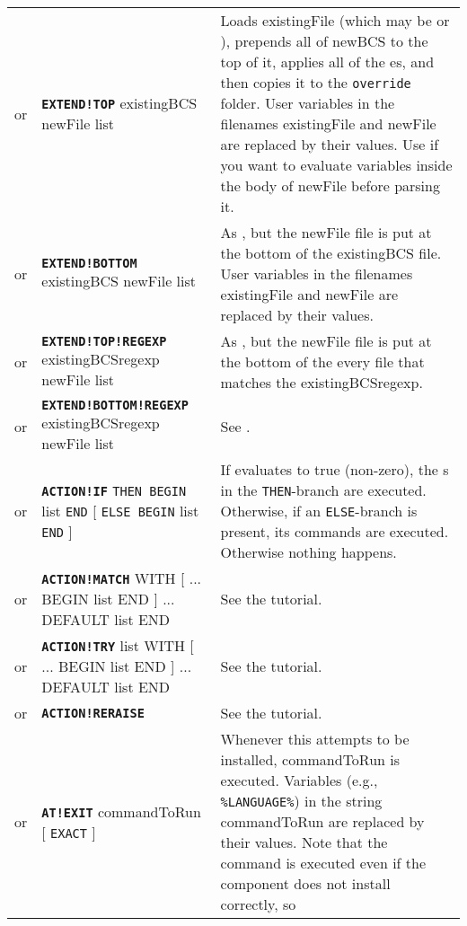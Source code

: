 \documentclass{article}
\def\ttref#1{\ahrefloc{#1}{\tt #1}}
\def\DEFINE#1{{\tt \bf #1}\label{#1}\index{#1}}
\def\DEFSYN#1{{\tt \bf #1}\index{#1}}
\def\t#1{{\tt #1}}
\def\Slist{{\color{red} list }}
\def\Ob{{\color{red} [ }}
\def\Oe{{\color{red} ] }}
\begin{document}
\begin{tabular}{cp{10in}|p{10in}}
  or & \DEFSYN{EXTEND!TOP} existingBCS newFile \ttref{patch} \Slist &
    Loads existingFile (which may be \ttref{BAF} or \ttref{BCS}), prepends
    all of newBCS to the top of it, applies all of the \ttref{patch}es, and
    then copies it to the \t{override} folder. User variables in
    the filenames existingFile and newFile are replaced by their values.
    Use \ttref{EVALUATE!BUFFER} if you want to evaluate variables inside
    the body of newFile before parsing it. \\
  or & \DEFSYN{EXTEND!BOTTOM} existingBCS newFile \ttref{patch} \Slist &
    As \ttref{EXTEND!TOP}, but the newFile file is put at the bottom of the
    existingBCS file. User variables in the filenames existingFile and
    newFile are replaced by their values. \\
  or & \DEFINE{EXTEND!TOP!REGEXP} existingBCSregexp newFile \ttref{patch} \Slist &
    As \ttref{EXTEND!TOP}, but the newFile file is put at the bottom of the
    every \ttref{BCS} file that matches the \ttref{regexp}
    existingBCSregexp. \\
  or & \DEFINE{EXTEND!BOTTOM!REGEXP} existingBCSregexp newFile \ttref{patch} \Slist &
    See \ttref{EXTEND!TOP!REGEXP}.  \\
  or & \DEFINE{ACTION!IF} \ttref{value} \t{THEN BEGIN}
    \ttref{TP2 Action} \Slist \t{END}
    \Ob \t{ELSE BEGIN} \ttref{TP2 Action} \Slist \t{END} \Oe &
    If \ttref{value} evaluates to true (non-zero), the \ttref{TP2 Action}s
    in the \t{THEN}-branch are executed. Otherwise, if an \t{ELSE}-branch
    is present, its commands are executed. Otherwise nothing happens. \\
  or & \DEFINE{ACTION!MATCH} \ttref{value} WITH \Ob \ttref{value} ...
    BEGIN \ttref{TP2 Action} \Slist END \Oe ...
    DEFAULT \ttref{TP2 Action} \Slist END &
    See the \ttref{MATCH and TRY} tutorial.
  \\
  or & \DEFINE{ACTION!TRY} \ttref{TP2 Action} \Slist WITH \Ob \ttref{value} ...
    BEGIN \ttref{TP2 Action} \Slist END \Oe ...
    DEFAULT \ttref{TP2 Action} \Slist END &
    See the \ttref{MATCH and TRY} tutorial.
  \\
  or & \DEFINE{ACTION!RERAISE} & See the \ttref{MATCH and TRY} tutorial.
  \\
  or & \DEFINE{AT!EXIT} commandToRun \Ob \t{EXACT} \Oe &
    Whenever this \ttref{component} attempts to be installed, commandToRun
    is executed.  Variables (e.g., \t{\%LANGUAGE\%}) in the string
    commandToRun are replaced by their values. Note that the command is
    executed even if the component does not install correctly, so

\end{tabular}
\end{document}
